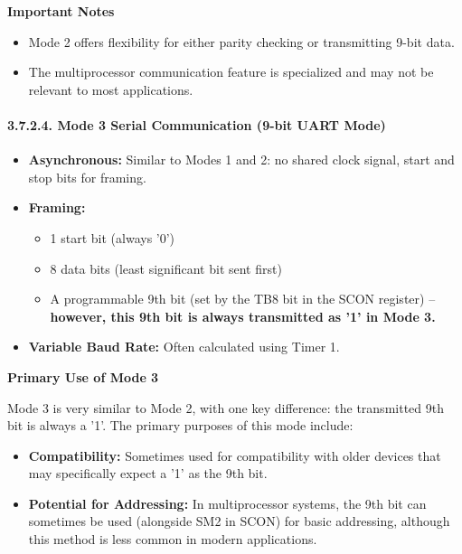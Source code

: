 \documentclass[
]{article}
\begin{document}
\textbf{Important Notes}

\begin{itemize}
\item
  Mode 2 offers flexibility for either parity checking or transmitting
  9-bit data.
\item
  The multiprocessor communication feature is specialized and may not be
  relevant to most applications.
\end{itemize}

\hypertarget{3724-mode-3-serial-communication-9-bit-uart-mode}{%
\paragraph{3.7.2.4. Mode 3 Serial Communication (9-bit UART
Mode)}\label{3724-mode-3-serial-communication-9-bit-uart-mode}}

\begin{itemize}
\item
  \textbf{Asynchronous:} Similar to Modes 1 and 2: no shared clock
  signal, start and stop bits for framing.
\item
  \textbf{Framing:}

  \begin{itemize}
  \item
    1 start bit (always '0')
  \item
    8 data bits (least significant bit sent first)
  \item
    A programmable 9th bit (set by the TB8 bit in the SCON register) --
    \textbf{however, this 9th bit is always transmitted as '1' in Mode
    3.}
  \end{itemize}
\item
  \textbf{Variable Baud Rate:} Often calculated using Timer 1.
\end{itemize}

\textbf{Primary Use of Mode 3}

Mode 3 is very similar to Mode 2, with one key difference: the
transmitted 9th bit is always a '1'. The primary purposes of this mode
include:

\begin{itemize}
\item
  \textbf{Compatibility:} Sometimes used for compatibility with older
  devices that may specifically expect a '1' as the 9th bit.
\item
  \textbf{Potential for Addressing:} In multiprocessor systems, the 9th
  bit can sometimes be used (alongside SM2 in SCON) for basic
  addressing, although this method is less common in modern
  applications.
\end{itemize}
\end{document}
